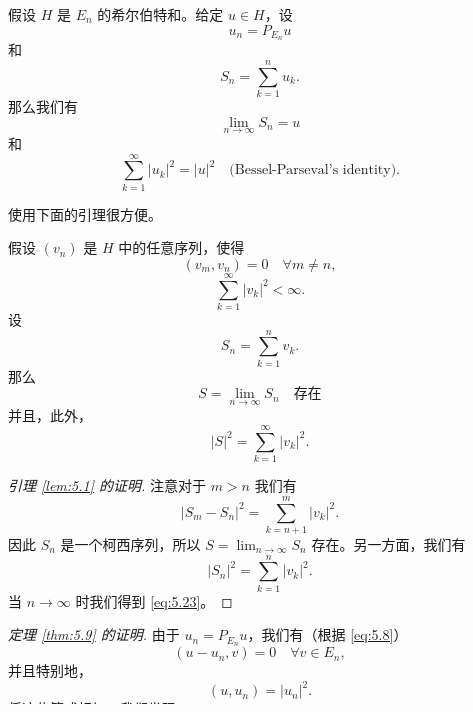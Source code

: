\begin{theorem}\label{thm:5.9}
假设 $H$ 是 $E_n$ 的希尔伯特和。给定 $u \in H$，设
\[ u_n = P_{E_n} u \]
和
\[ S_n = \sum_{k=1}^n u_k. \]
那么我们有
\begin{equation}\label{eq:5.19}
\lim_{n\to\infty} S_n = u
\end{equation}
和
\begin{equation}\label{eq:5.20}
\sum_{k=1}^\infty |u_k|^2 = |u|^2 \quad \text{(Bessel-Parseval's identity)}.
\end{equation}
\end{theorem}
使用下面的引理很方便。
\begin{lemma}\label{lem:5.1}
假设 $(v_n)$ 是 $H$ 中的任意序列，使得
\begin{equation}\label{eq:5.21}
(v_m, v_n) = 0 \quad \forall m \ne n,
\end{equation}
\begin{equation}\label{eq:5.22}
\sum_{k=1}^\infty |v_k|^2 < \infty.
\end{equation}
设
\[ S_n = \sum_{k=1}^n v_k. \]
那么
\[ S = \lim_{n\to\infty} S_n \quad \text{存在} \]
并且，此外，
\begin{equation}\label{eq:5.23}
|S|^2 = \sum_{k=1}^\infty |v_k|^2.
\end{equation}
\end{lemma}
\begin{proof}[引理 \ref{lem:5.1} 的证明]
注意对于 $m>n$ 我们有
\[ |S_m - S_n|^2 = \sum_{k=n+1}^m |v_k|^2. \]
因此 $S_n$ 是一个柯西序列，所以 $S = \lim_{n\to\infty} S_n$ 存在。另一方面，我们有
\[ |S_n|^2 = \sum_{k=1}^n |v_k|^2. \]
当 $n\to\infty$ 时我们得到 \eqref{eq:5.23}。
\end{proof}
\begin{proof}[定理 \ref{thm:5.9} 的证明]
由于 $u_n = P_{E_n}u$，我们有（根据 \eqref{eq:5.8}）
\begin{equation}\label{eq:5.24}
(u-u_n, v) = 0 \quad \forall v \in E_n,
\end{equation}
并且特别地，
\[ (u,u_n) = |u_n|^2. \]
将这些等式相加，我们发现
\[ (u,S_n) = \sum_{k=1}^n |u_k|^2. \]
但是我们也有
\begin{equation}\label{eq:5.25}
\sum_{k=1}^n |u_k|^2 = |S_n|^2,
\end{equation}
因此我们得到
\[ (u,S_n) = |S_n|^2. \]
因此 $|S_n| \le |u|$ 并且因此 $\sum_{k=1}^n |u_k|^2 \le |u|^2$。
因此我们可以应用引理 \ref{lem:5.1} 并得出结论 $S = \lim_{n\to\infty} S_n$ 存在。让我们甚至在\textit{没有假设}（b）的情况下确定 $S$。设 $F$ 是由 $E_n$ 生成的线性空间。我们断言
\begin{equation}\label{eq:5.26}
S = P_{\overline{F}} u.
\end{equation}
确实，我们有
\[ (u-S_n, v) = 0 \quad \forall v \in E_m, \; m \le n \]
（只需写出 $u-S_n = (u-u_m) - \sum_{k \ne m} u_k$）。当 $n \to \infty$ 时我们得到
\[ (u-S,v) = 0 \quad \forall v \in E_m, \quad \forall m \]
因此
\[ (u-S,v) = 0 \quad \forall v \in F, \]
这意味着
\[ (u-S,v) = 0 \quad \forall v \in \overline{F}. \]
另一方面，$S_n \in F \; \forall n$，并且在极限情况下 $S \in \overline{F}$。这证明了 \eqref{eq:5.26}。当然，如果（b）成立，那么 $\overline{F}=H$ 并且因此 $S=u$。在 \eqref{eq:5.25} 中令 $n \to \infty$ 我们得到 \eqref{eq:5.20}。
\end{proof}

